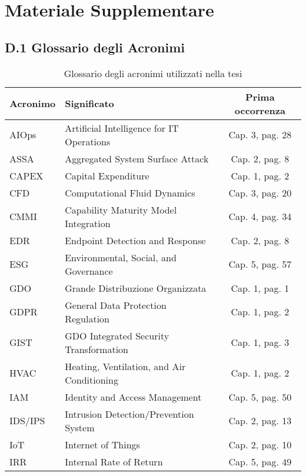 
\chapter{\texorpdfstring{\textbf{Materiale Supplementare}}{Appendice D - Materiale Supplementare}}
\label{app:supplementare}

\section{\texorpdfstring{\textbf{D.1 Glossario degli Acronimi}}{D.1 - Glossario degli Acronimi}}

\begin{table}[htbp]
\centering
\caption{Glossario degli acronimi utilizzati nella tesi}
\label{tab:glossario}
\begin{tabular}{llc}
\toprule
\textbf{Acronimo} & \textbf{Significato} & \textbf{Prima occorrenza} \\
\midrule
AIOps & Artificial Intelligence for IT Operations & Cap. 3, pag. 28 \\
ASSA & Aggregated System Surface Attack & Cap. 2, pag. 8 \\
CAPEX & Capital Expenditure & Cap. 1, pag. 2 \\
CFD & Computational Fluid Dynamics & Cap. 3, pag. 20 \\
CMMI & Capability Maturity Model Integration & Cap. 4, pag. 34 \\
EDR & Endpoint Detection and Response & Cap. 2, pag. 8 \\
ESG & Environmental, Social, and Governance & Cap. 5, pag. 57 \\
GDO & Grande Distribuzione Organizzata & Cap. 1, pag. 1 \\
GDPR & General Data Protection Regulation & Cap. 1, pag. 2 \\
GIST & GDO Integrated Security Transformation & Cap. 1, pag. 3 \\
HVAC & Heating, Ventilation, and Air Conditioning & Cap. 1, pag. 2 \\
IAM & Identity and Access Management & Cap. 5, pag. 50 \\
IDS/IPS & Intrusion Detection/Prevention System & Cap. 2, pag. 13 \\
IoT & Internet of Things & Cap. 2, pag. 10 \\
IRR & Internal Rate of Return & Cap. 5, pag. 49 \\

\end{tabular}
\end{table}
